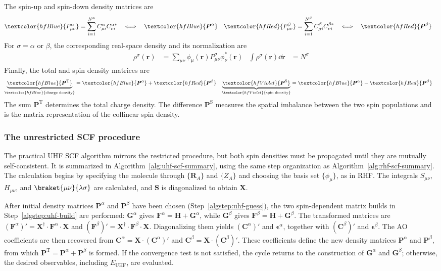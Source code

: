 \documentclass[11pt,a4paper,titlepage]{article}
\numberwithin{equation}{section}
\newcommand{\br}{\boldsymbol{r}}
\newcommand{\bC}{\boldsymbol{C}}
\newcommand{\bF}{\boldsymbol{F}}
\newcommand{\bG}{\boldsymbol{G}}
\newcommand{\bH}{\boldsymbol{H}}
\newcommand{\bP}{\boldsymbol{P}}
\newcommand{\bR}{\boldsymbol{R}}
\newcommand{\bS}{\boldsymbol{S}}
\newcommand{\bX}{\boldsymbol{X}}
\newcommand{\beps}{\boldsymbol{\epsilon}}
\newcommand{\red}[1]{\textcolor{hfRed}{#1}}
\newcommand{\blue}[1]{\textcolor{hfBlue}{#1}}
\newcommand{\violet}[1]{\textcolor{hfViolet}{#1}}
\begin{document}
The spin-up and spin-down density matrices are
\begin{align}
  &
    \blue{P_{\mu\nu}^\alpha}
    =\sum_{i=1}^{N^\alpha}C_{\mu i}^\alpha C_{\nu i}^{\alpha *}
    \quad\Longleftrightarrow\quad\blue{\bP^\alpha}
  &
  &
    \red{P_{\mu\nu}^\beta}
    =\sum_{i=1}^{N^\beta}C_{\mu i}^\beta C_{\nu i}^{\beta *}
    \quad\Longleftrightarrow\quad\red{\bP^\beta}
\end{align}
For $\sigma=\alpha$ or $\beta$, the corresponding real-space density and
its normalization are
\begin{align}
  \rho^\sigma(\br)
  &=\sum_{\mu\nu}\phi_\mu(\br)P_{\mu\nu}^\sigma
    \phi_\nu^*(\br)
  &
  \int\rho^\sigma(\br)\dd{\br}
  &=N^\sigma
\end{align}
Finally, the total and spin density matrices are
\begin{align}
  \underbrace{\blue{\bP^\text{T}}}_{\blue{\text{charge density}}}
  &=\blue{\bP^\alpha}+\red{\bP^\beta}
  &
  \underbrace{\violet{\bP^\text{S}}}_{\violet{\text{spin density}}}
  &=\blue{\bP^\alpha}-\red{\bP^\beta}
\end{align}
The sum $\bP^\text{T}$ determines the total charge density. The difference
$\bP^\text{S}$ measures the spatial imbalance between the two spin
populations and is the matrix representation of the collinear spin density.

\subsubsection{The unrestricted SCF procedure}

The practical UHF SCF algorithm mirrors the restricted procedure, but both
spin densities must be propagated until they are mutually self-consistent. It
is summarized in Algorithm~\ref{alg:uhf-scf-summary}, using the same step
organization as Algorithm~\ref{alg:rhf-scf-summary}. The calculation
begins by specifying the molecule through $\{\bR_A\}$ and $\{Z_A\}$
and choosing the basis set $\{\phi_\mu\}$, as in RHF. The integrals
$S_{\mu\nu}$, $H_{\mu\nu}$, and
$\braket{\mu\nu}{\lambda\sigma}$ are calculated, and $\bS$ is diagonalized
to obtain $\bX$.

After initial density matrices $\bP^\alpha$ and $\bP^\beta$ have been
chosen (Step~\ref{algstep:uhf-guess}), the two spin-dependent matrix builds
in Step~\ref{algstep:uhf-build} are performed:
$\bG^\alpha$ gives $\bF^\alpha=\bH+\bG^\alpha$, while $\bG^\beta$ gives
$\bF^\beta=\bH+\bG^\beta$. The transformed matrices are
$(\bF^\alpha)'=\bX^\dag\cdot\bF^\alpha\cdot\bX$ and
$(\bF^\beta)'=\bX^\dag\cdot\bF^\beta\cdot\bX$. Diagonalizing them yields
$(\bC^\alpha)'$ and $\beps^\alpha$, together with $(\bC^\beta)'$ and
$\beps^\beta$. The AO coefficients are then recovered from
$\bC^\alpha=\bX\cdot(\bC^\alpha)'$ and
$\bC^\beta=\bX\cdot(\bC^\beta)'$. These coefficients define the
new density matrices $\bP^\alpha$ and $\bP^\beta$, from which
$\bP^\text{T}=\bP^\alpha+\bP^\beta$ is formed. If the convergence test is
not satisfied, the cycle returns to the construction of $\bG^\alpha$ and
$\bG^\beta$; otherwise, the desired observables, including
$E_\text{UHF}$, are evaluated.
\end{document}
